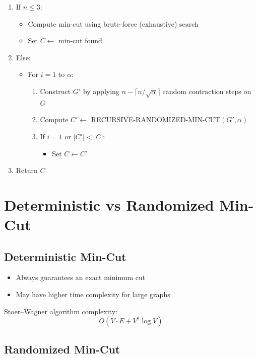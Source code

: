 \documentclass[12pt]{article}
\begin{document}
\begin{enumerate}
    \item If $n \le 3$:
    \begin{itemize}
        \item Compute min-cut using brute-force (exhaustive) search
        \item Set $C \leftarrow$ min-cut found
    \end{itemize}
    \item Else:
    \begin{itemize}
        \item For $i = 1$ to $\alpha$:
        \begin{enumerate}
            \item Construct $G'$ by applying $n - \lceil n/\sqrt{\alpha} \rceil$ random contraction steps on $G$
            \item Compute $C' \leftarrow$ RECURSIVE-RANDOMIZED-MIN-CUT$(G', \alpha)$
            \item If $i = 1$ or $|C'| < |C|$:
            \begin{itemize}
                \item Set $C \leftarrow C'$
            \end{itemize}
        \end{enumerate}
    \end{itemize}
    \item Return $C$
\end{enumerate}

\section{Deterministic vs Randomized Min-Cut}

\subsection{Deterministic Min-Cut}

\begin{itemize}
    \item Always guarantees an exact minimum cut
    \item May have higher time complexity for large graphs
\end{itemize}

Stoer–Wagner algorithm complexity:
\[
O(V \cdot E + V^2 \log V)
\]

\subsection{Randomized Min-Cut}
\end{document}
